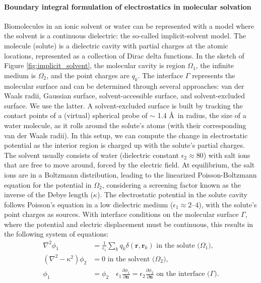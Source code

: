 \paragraph{Boundary integral formulation of electrostatics in molecular solvation}\label{s:formulation}

Biomolecules in an ionic solvent or water can be represented with a model where the solvent is a continuous dielectric: the so-called implicit-solvent model.
The molecule (solute) is a dielectric cavity with partial charges at the atomic locations,  represented as a collection of Dirac delta functions.
In  the sketch of Figure \ref{fig:implicit_solvent}, the molecular cavity is region $\Omega_1$, the infinite medium  is $\Omega_2$, and the point charges are $q_k$.
The interface $\Gamma$ represents the molecular surface and can be determined through several approaches: van der Waals radii, Gaussian surface, solvent-accessible surface, and solvent-excluded surface. 
We use the latter.
A solvent-excluded surface is built by tracking the contact points of a (virtual) spherical probe of  $\sim$ 1.4 \AA\ in radius, the size of a water molecule, as it rolls around the solute's atoms (with their corresponding van der Waals radii). 
In this setup, we can compute the change in electrostatic potential as the interior region is charged up with the solute's partial charges.
The solvent usually consists of water (dielectric constant $\epsilon_2\approx80$) with salt ions that are free to move around, forced by the electric field. 
At equilibrium, the salt ions are in a Boltzmann distribution, leading to the linearized Poisson-Boltzmann equation for the potential in $\Omega_2$, considering a screening factor known as the inverse of the Debye length ($\kappa$). 
The electrostatic potential in the solute cavity follows Poisson's equation in a low dielectric medium ($\epsilon_1\approx2\textrm{--}4$), with the solute's point charges as sources.
With interface conditions on the molecular surface $\Gamma$, where the potential and electric displacement must be continuous, this results in the following system of equations:
%
\begin{align} \label{eq:pde}
\nabla^2\phi_1 &= \frac{1}{\epsilon_1}\sum_k q_k\delta(\mathbf{r},\mathbf{r}_k) \text{ in the solute ($\Omega_1$),}\nonumber\\
(\nabla^2-\kappa^2)\phi_2 &= 0 \text{ in the solvent ($\Omega_2$),}\nonumber\\
\phi_1 &= \phi_2 \quad \epsilon_1\frac{\partial \phi_1}{\partial\mathbf{n}} = \epsilon_2\frac{\partial \phi_2}{\partial\mathbf{n}} \text{ on the interface ($\Gamma$)}.
\end{align}
%

